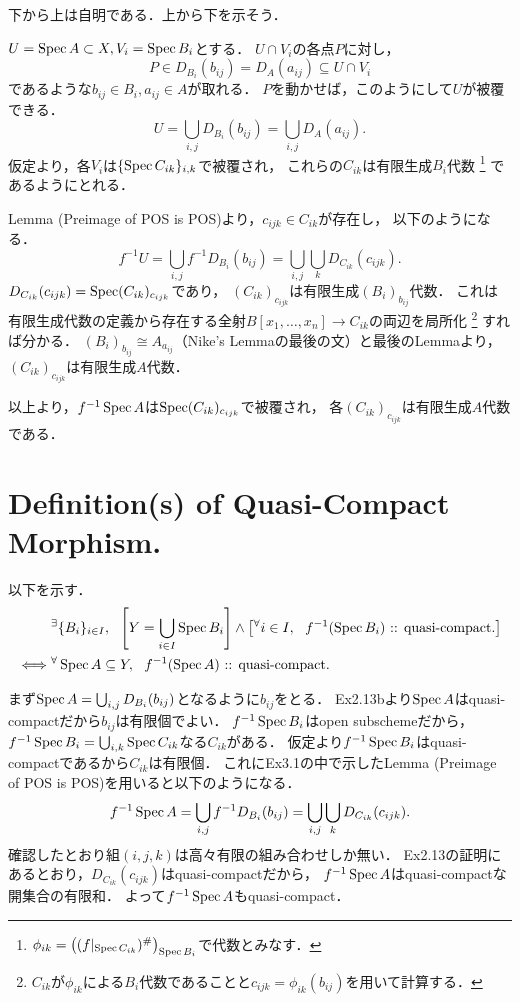 \documentclass[a4paper]{jsarticle}
\begin{document}
下から上は自明である．上から下を示そう．

$U=\operatorname{Spec} A \subset X, V_i=\operatorname{Spec} B_i$とする．
$U \cap V_i$の各点$P$に対し，
\[ P \in D_{B_i}(b_{ij})=D_A(a_{ij}) \subseteq U \cap V_i \]
であるような$b_{ij} \in B_i, a_{ij} \in A$が取れる．
$P$を動かせば，このようにして$U$が被覆できる．
\[ U=\bigcup_{i,j} D_{B_i}(b_{ij})=\bigcup_{i,j} D_A(a_{ij}). \]
仮定より，各$V_i$は$\{ \operatorname{Spec} C_{ik} \}_{i,k}$で被覆され，
これらの$C_{ik}$は有限生成$B_i$代数
\footnote{$\phi_{ik}=\left((f|_{\operatorname{Spec} C_{ik}})^{\#}\right)_{\operatorname{Spec} B_i}$で代数とみなす．}
であるようにとれる．

Lemma (Preimage of POS is POS)より，$c_{ijk} \in C_{ik}$が存在し，
以下のようになる．
\[ f^{-1}U=\bigcup_{i,j} f^{-1}D_{B_i}(b_{ij})=\bigcup_{i,j} \bigcup_{k} D_{C_{ik}}(c_{ijk}). \]
$D_{C_{ik}}(c_{ijk})=\operatorname{Spec} (C_{ik})_{c_{ijk}}$であり，
$(C_{ik})_{c_{ijk}}$は有限生成$(B_i)_{b_{ij}}$代数．
これは有限生成代数の定義から存在する全射$B[x_1,\dots,x_n] \to C_{ik}$の両辺を局所化
\footnote{$C_{ik}$が$\phi_{ik}$による$B_i$代数であることと$c_{ijk}=\phi_{ik}(b_{ij})$を用いて計算する．}
すれば分かる．
$(B_i)_{b_{ij}} \cong A_{a_{ij}}$（Nike's Lemmaの最後の文）と最後のLemmaより，
$(C_{ik})_{c_{ijk}}$は有限生成$A$代数．

以上より，$f^{-1}\operatorname{Spec} A$は$\operatorname{Spec} (C_{ik})_{c_{ijk}}$で被覆され，
各$(C_{ik})_{c_{ijk}}$は有限生成$A$代数である．

\section{Definition(s) of Quasi-Compact Morphism.} %
以下を示す．
\begin{align*}
    {}&
        {}^{\exists} \{B_i\}_{i \in I},~~
        \left[Y=\bigcup_{i \in I} \operatorname{Spec} B_i\right] \land \left[{}^{\forall} i \in I,~~ f^{-1}(\operatorname{Spec} B_i)\text{ :: quasi-compact.}\right] \\
    \iff&
        {}^{\forall} \operatorname{Spec} A \subseteq Y,~~ f^{-1}(\operatorname{Spec} A)\text{ :: quasi-compact.}
\end{align*}

まず$\operatorname{Spec} A=\bigcup_{i,j} D_{B_i}(b_{ij})$となるように$b_{ij}$をとる．
Ex2.13bより$\operatorname{Spec} A$はquasi-compactだから$b_{ij}$は有限個でよい．
$f^{-1}\operatorname{Spec} B_i$はopen subschemeだから，
$f^{-1}\operatorname{Spec} B_i=\bigcup_{i,k} \operatorname{Spec} C_{ik}$なる$C_{ik}$がある．
仮定より$f^{-1}\operatorname{Spec} B_i$はquasi-compactであるから$C_{ik}$は有限個．
これにEx3.1の中で示したLemma (Preimage of POS is POS)を用いると以下のようになる．
\[ f^{-1}\operatorname{Spec} A=\bigcup_{i,j} f^{-1}D_{B_i}(b_{ij})=\bigcup_{i,j} \bigcup_{k} D_{C_{ik}}(c_{ijk}). \]
確認したとおり組$(i,j,k)$は高々有限の組み合わせしか無い．
Ex2.13の証明にあるとおり，$D_{C_{ik}}(c_{ijk})$はquasi-compactだから，
$f^{-1}\operatorname{Spec} A$はquasi-compactな開集合の有限和．
よって$f^{-1}\operatorname{Spec} A$もquasi-compact．
\end{document}

